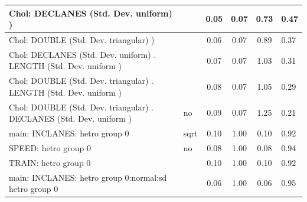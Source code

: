 \begin{table}
\begin{center}
\begin{tabular}{|l|l|c|c|c|l|}
			\hline
			 Chol: DECLANES (Std. Dev. uniform) ) &  & 0.05 & 0.07 & 0.73 & 0.47 \\
			\hline
			 Chol: DOUBLE (Std. Dev. triangular) ) &  & 0.06 & 0.07 & 0.89 & 0.37 \\
			\hline
			 Chol: DECLANES (Std. Dev. uniform) . LENGTH (Std. Dev.   uniform ) &  & 0.07 & 0.07 & 1.03 & 0.31 \\
			\hline
			 Chol: DOUBLE (Std. Dev. triangular) . LENGTH (Std. Dev.   uniform ) &  & 0.08 & 0.07 & 1.05 & 0.29 \\
			\hline
			 Chol: DOUBLE (Std. Dev. triangular) . DECLANES (Std. Dev.   uniform ) & no & 0.09 & 0.07 & 1.25 & 0.21 \\
			\hline
			main: INCLANES: hetro group 0 & sqrt & 0.10 & 1.00 & 0.10 & 0.92 \\
			\hline
			SPEED: hetro group 0 & no & 0.08 & 1.00 & 0.08 & 0.94 \\
			\hline
			TRAIN: hetro group 0 &  & 0.10 & 1.00 & 0.10 & 0.92 \\
			\hline
			main: INCLANES: hetro group 0:normal:sd  hetro group 0 &  & 0.06 & 1.00 & 0.06 & 0.95 \\
			\hline
		\end{tabular}
	\end{center}
\end{table}